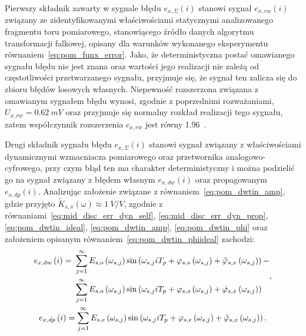 Pierwszy składnik zawarty w sygnale błędu $e_{x,\Sigma}(i)$ stanowi sygnał $e_{x,rw}(i)$ związany ze zidentyfikowanymi właściwościami statycznymi analizowanego fragmentu toru pomiarowego, stanowiącego źródło danych algorytmu transformacji falkowej, opisany dla warunków wykonanego eksperymentu równaniem~\eqref{eq:pom_funx_error}. Jako, że deterministyczna postać omawianego sygnału błędu nie jest znana oraz wartości jego realizacji nie zależą od częstotliwości przetwarzanego sygnału, przyjmuje się, że sygnał ten zalicza się do zbioru błędów losowych własnych. Niepewność rozszerzona związana z omawianym sygnałem błędu wynosi, zgodnie z poprzednimi rozważaniami, $U_{x,rw} = \qty{0.62}{mV}$ oraz przyjmuje się normalny rozkład realizacji tego sygnału, zatem współczynnik rozszerzenia $c_{x,rw}$ jest równy \num{1.96}~\cite{jcgm_guide}.

Drugi składnik sygnału błędu $e_{x,\Sigma}(i)$ stanowi sygnał związany z właściwościami dynamicznymi wzmacniacza pomiarowego oraz przetwornika analogowo-cyfrowego, przy czym błąd ten ma charakter deterministyczny i można podzielić go na sygnał związany z błędem własnym $e_{x,dw}(i)$ oraz propagowanym $e_{x,dp}(i)$. Analizując założenie związane z równaniem~\eqref{eq:pom_dwtin_amp}, gdzie przyjęto $\tilde{K}_{s,x}(\omega) \approx \qty{1}{V \per V}$, zgodnie z równaniami~\eqref{eq:mid_disc_err_dyn_self}, \eqref{eq:mid_disc_err_dyn_prop}, \eqref{eq:pom_dwtin_ideal}, \eqref{eq:pom_dwtin_amp}, \eqref{eq:pom_dwtin_phi} oraz założeniem opisanym równaniem~\eqref{eq:pom_dwtin_phiideal} zachodzi:
\begin{gather}
\begin{split}
e_{x,dw} \left(i\right) =~
& \sum _{j = 1} ^{\infty} E_{s,o} \left(\omega_{s,j}\right) \sin \left( \omega_{s,j} iT_{p} + \varphi_{s,o} \left(\omega_{s,j}\right) + \tilde{\varphi}_{s,x} \left(\omega_{s,j}\right) \right) - \\
& \sum _{j = 1} ^{\infty} E_{s,o} \left(\omega_{s,j}\right) \sin \left( \omega_{s,j} iT_{p} + \varphi_{s,o} \left(\omega_{s,j}\right) + \dot{\varphi}_{s,x} \left(\omega_{s,j}\right) \right)
\end{split}
\label{eq:pom_errx_dyn_self}, \\
e_{x,dp} \left(i\right) = \sum _{j = 1} ^{\infty} E_{s,e} \left(\omega_{s,j}\right) \sin \left( \omega_{s,j} iT_{p} + \varphi_{s,e} \left(\omega_{s,j}\right) + \tilde{\varphi}_{s,x} \left(\omega_{s,j}\right) \right) \label{eq:pom_errx_dyn_prop}.
\end{gather}

